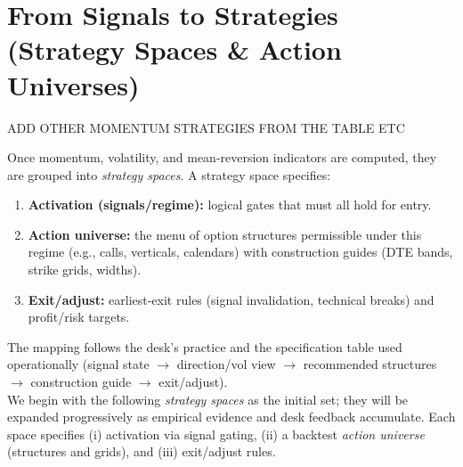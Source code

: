 \documentclass[12pt,a4paper]{report}
\begin{document}
\section{From Signals to Strategies (Strategy Spaces \& Action Universes)}
\label{sec:spaces_action}

ADD OTHER MOMENTUM STRATEGIES FROM THE TABLE ETC 


Once momentum, volatility, and mean-reversion indicators are computed, they are grouped into \emph{strategy spaces}. A strategy space specifies:
\begin{enumerate}
    \item \textbf{Activation (signals/regime):} logical gates that must all hold for entry.
    \item \textbf{Action universe:} the menu of option structures permissible under this regime (e.g., calls, verticals, calendars) with construction guides (DTE bands, strike grids, widths).
    \item \textbf{Exit/adjust:} earliest-exit rules (signal invalidation, technical breaks) and profit/risk targets.
\end{enumerate}

The mapping follows the desk’s practice and the specification table used operationally (signal state $\rightarrow$ direction/vol view $\rightarrow$ recommended structures $\rightarrow$ construction guide $\rightarrow$ exit/adjust).
\\

We begin with the following \emph{strategy spaces} as the initial set; they will be expanded progressively as empirical evidence and desk feedback accumulate. Each space specifies (i) activation via signal gating, (ii) a backtest \emph{action universe} (structures and grids), and (iii) exit/adjust rules.
\end{document}
